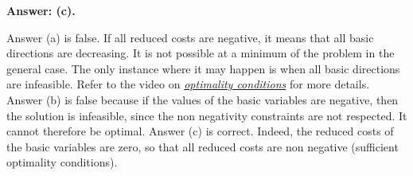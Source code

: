{\bf Answer: (c).} 

Answer (a) is false. If all reduced costs are negative, it means that
all basic directions are decreasing. It is not possible at a minimum
of the problem in the general case. The only instance where it may happen is
when all basic directions are infeasible. Refer to the video on
\href{https://www.youtube.com/watch?v=UJEnS4brKyI}{\textit{optimality
    conditions}} for more details.
Answer (b) is false because if the
values of the basic variables are negative, then the solution is
infeasible, since the non negativity constraints are not respected. It
cannot therefore be optimal.  Answer (c) is correct. Indeed, the
reduced costs of the basic variables are zero, so that all reduced
costs are non negative (sufficient optimality conditions).
